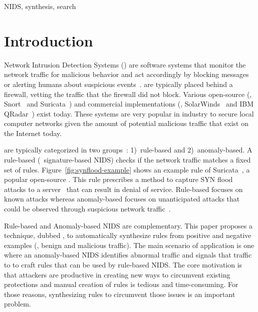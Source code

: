 \documentclass[conference]{IEEEtran}
\begin{document}
\begin{IEEEkeywords}
NIDS, synthesis, search
\end{IEEEkeywords}

\section{Introduction}

Network Intrusion Detection Systems (\nids{}) are software systems
that monitor the network traffic for malicious behavior and act
accordingly by blocking messages or alerting humans about suspicious
events~\cite{Mitchell:2014:SID:2597757.2542049}. \nids{} are typically
placed behind a firewall, vetting the traffic that the firewall did
not block. Various open-source (\eg{}, Snort~\cite{snort} and
Suricata~\cite{suricata}) and commercial implementations (\eg{},
SolarWinds~\cite{solarwinds} and IBM QRadar~\cite{qradar}) exist
today. These systems are very popular in industry to secure local
computer networks given the amount of potential malicious traffic that
exist on the Internet today.

\sloppy \nids{} are typically categorized in two
groups~\cite{kumar2007survey}: 1)~rule-based and 2)~anomaly-based. A
rule-based \nids{} (\aka\ signature-based NIDS) checks if the network
traffic matches a fixed set of
rules. Figure~\ref{fig:synflood-example} shows an example rule of
Suricata~\cite{suricata}, a popular open-source \nids{}. This rule
prescribes a method to capture SYN flood attacks to a
server~\cite{Douligeris:2004:DAD:987153.987158} that can result in
denial of service. Rule-based \nids{} focuses on known attacks whereas
anomaly-based \nids{} focuses on unanticipated attacks that could be
observed through suspicious network
traffic~\cite{kumar2007survey,Mitchell:2014:SID:2597757.2542049,cordy-etal-issta19}.

Rule-based and Anomaly-based NIDS are complementary. This paper
proposes a technique, dubbed \tname{}, to automatically synthesize
rules from positive and negative examples (\ie{}, benign and malicious
traffic). The main scenario of application is one where an
anomaly-based NIDS identifies abnormal traffic and signals that
traffic to \tname{} to craft rules that can be used by rule-based
NIDS. The core motivation is that attackers are productive in creating
new ways to circumvent existing protections and manual creation of
rules is tedious and time-consuming. For those reasons, synthesizing rules to
circumvent those issues is an important problem.
\end{document}
